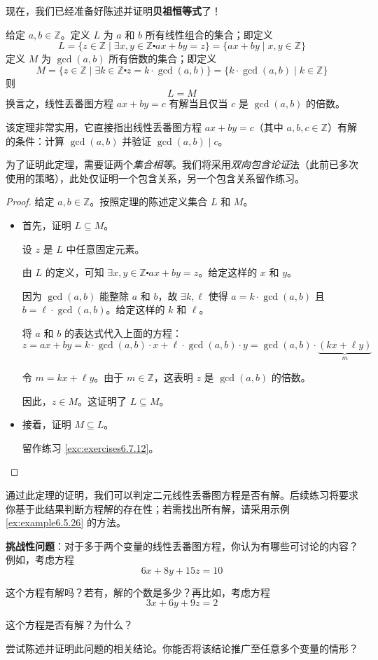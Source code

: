 现在，我们已经准备好陈述并证明\textbf{贝祖恒等式}了！

\begin{theorem}[贝祖恒等式]\label{theorem6.5.31}
   给定 $a, b \in \mathbb{Z}$。定义 $L$ 为 $a$ 和 $b$ 所有线性组合的集合；即定义
   \[L = \{z \in \mathbb{Z} \mid \exists x, y \in \mathbb{Z} \centerdot ax + by = z\} = \{ax + by \mid x, y \in \mathbb{Z}\}\]
   定义 $M$ 为 $\gcd(a, b)$ 所有倍数的集合；即定义
   \[M = \{z \in \mathbb{Z} \mid \exists k \in \mathbb{Z} \centerdot z = k \cdot \gcd(a, b)\} = \{k \cdot \gcd(a, b) \mid k \in \mathbb{Z}\}\]
   则
   \[L = M\]
   换言之，线性丢番图方程 $ax + by = c$ 有解当且仅当 $c$ 是 $\gcd(a, b)$ 的倍数。
\end{theorem}

该定理非常实用，它直接指出线性丢番图方程 $ax + by = c$（其中 $a, b, c \in \mathbb{Z}$）有解的条件：计算 $\gcd(a, b)$ 并验证 $\gcd(a, b) \mid c$。

为了证明此定理，需要证两个\emph{集合相等}。我们将采用\emph{双向包含论证}法（此前已多次使用的策略），此处仅证明一个包含关系，另一个包含关系留作练习。

\begin{proof}
    给定 $a, b \in \mathbb{Z}$。按照定理的陈述定义集合 $L$ 和 $M$。
    \begin{itemize}
        \item 首先，证明 $L \subseteq M$。
        
            设 $z$ 是 $L$ 中任意固定元素。

            由 $L$ 的定义，可知 $\exists x, y \in \mathbb{Z} \centerdot ax + by = z$。给定这样的 $x$ 和 $y$。

            因为 $\gcd(a, b)$ 能整除 $a$ 和 $b$，故 $\exists k, \ell$ 使得 $a = k \cdot \gcd(a, b)$ 且 $b = \ell  \cdot \gcd(a, b)$。给定这样的 $k$ 和 $\ell$。

            将 $a$ 和 $b$ 的表达式代入上面的方程：
            \[z = ax + by = k \cdot \gcd(a, b) \cdot x + \ell \cdot \gcd(a, b) \cdot y = \gcd(a, b) \cdot \underbrace{(kx + \ell y)}_{m}\]

            令 $m = kx + \ell y$。由于 $m \in \mathbb{Z}$，这表明 $z$ 是 $\gcd(a, b)$ 的倍数。

            因此，$z \in M$。这证明了 $L \subseteq M$。\\
        \item 接着，证明 $M \subseteq L$。

            留作练习 \ref{exc:exercises6.7.12}。
    \end{itemize}
\end{proof}

通过此定理的证明，我们可以判定二元线性丢番图方程是否有解。后续练习将要求你基于此结果判断方程解的存在性；若需找出所有解，请采用示例 \ref{ex:example6.5.26} 的方法。

\textbf{挑战性问题}：对于多于两个变量的线性丢番图方程，你认为有哪些可讨论的内容？例如，考虑方程
\[6x + 8y + 15z = 10\]

这个方程有解吗？若有，解的个数是多少？再比如，考虑方程
\[3x + 6y + 9z = 2\]

这个方程是否有解？为什么？

尝试陈述并证明此问题的相关结论。你能否将该结论推广至任意多个变量的情形？

